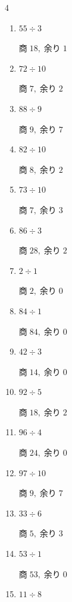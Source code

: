\begin{multicols}{4}
\begin{enumerate}
  \item $55 \div 3$

        $商\; 18,\; 余り\; 1$

  \item $72 \div 10$

        $商\; 7,\; 余り\; 2$

  \item $88 \div 9$

        $商\; 9,\; 余り\; 7$

  \item $82 \div 10$

        $商\; 8,\; 余り\; 2$

  \item $73 \div 10$

        $商\; 7,\; 余り\; 3$

  \item $86 \div 3$

        $商\; 28,\; 余り\; 2$

\columnbreak %

\resetques

  \item $2 \div 1$

        $商\; 2,\; 余り\; 0$

  \item $84 \div 1$

        $商\; 84,\; 余り\; 0$

  \item $42 \div 3$

        $商\; 14,\; 余り\; 0$

  \item $92 \div 5$

        $商\; 18,\; 余り\; 2$

  \item $96 \div 4$

        $商\; 24,\; 余り\; 0$

  \item $97 \div 10$

        $商\; 9,\; 余り\; 7$

  \item $33 \div 6$

        $商\; 5,\; 余り\; 3$

  \item $53 \div 1$

        $商\; 53,\; 余り\; 0$

  \item $11 \div 8$


\end{enumerate}
\end{multicols}
